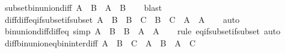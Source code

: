 \begin{isabellebody}
\isanewline
%
\endisadelimproof
\isanewline
{}\isamarkupfalse%
\ subset{\isacharunderscore}{\kern0pt}bin{\isacharunderscore}{\kern0pt}union{\isacharunderscore}{\kern0pt}diff{\isacharcolon}{\kern0pt}\ {\isachardoublequoteopen}A\ {\isasymsubseteq}\ B\ {\isasymunion}\ {\isacharparenleft}{\kern0pt}A\ {\isasymsetminus}\ B{\isacharparenright}{\kern0pt}{\isachardoublequoteclose}\isanewline
%
\isadelimproof
\ \ %
\endisadelimproof
%
\isatagproof
{}\isamarkupfalse%
\ blast%
\endisatagproof
{\isafoldproof}%
%
\isadelimproof
\isanewline
%
\endisadelimproof
\isanewline
{}\isamarkupfalse%
\ diff{\isacharunderscore}{\kern0pt}diff{\isacharunderscore}{\kern0pt}eq{\isacharunderscore}{\kern0pt}if{\isacharunderscore}{\kern0pt}subset{\isacharunderscore}{\kern0pt}if{\isacharunderscore}{\kern0pt}subset{\isacharcolon}{\kern0pt}\ {\isachardoublequoteopen}A\ {\isasymsubseteq}\ B\ {\isasymLongrightarrow}\ B\ {\isasymsubseteq}\ C\ {\isasymLongrightarrow}\ B\ {\isasymsetminus}\ {\isacharparenleft}{\kern0pt}C\ {\isasymsetminus}\ A{\isacharparenright}{\kern0pt}\ {\isacharequal}{\kern0pt}\ A{\isachardoublequoteclose}\isanewline
%
\isadelimproof
\ \ %
\endisadelimproof
%
\isatagproof
{}\isamarkupfalse%
\ auto%
\endisatagproof
{\isafoldproof}%
%
\isadelimproof
\isanewline
%
\endisadelimproof
\isanewline
{}\isamarkupfalse%
\ bin{\isacharunderscore}{\kern0pt}union{\isacharunderscore}{\kern0pt}diff{\isacharunderscore}{\kern0pt}diff{\isacharunderscore}{\kern0pt}eq\ {\isacharbrackleft}{\kern0pt}simp{\isacharbrackright}{\kern0pt}{\isacharcolon}{\kern0pt}\ {\isachardoublequoteopen}{\isacharparenleft}{\kern0pt}A\ {\isasymunion}\ B{\isacharparenright}{\kern0pt}\ {\isasymsetminus}\ {\isacharparenleft}{\kern0pt}B\ {\isasymsetminus}\ A{\isacharparenright}{\kern0pt}\ {\isacharequal}{\kern0pt}\ A{\isachardoublequoteclose}\isanewline
%
\isadelimproof
\ \ %
\endisadelimproof
%
\isatagproof
{}\isamarkupfalse%
\ {\isacharparenleft}{\kern0pt}rule\ eq{\isacharunderscore}{\kern0pt}if{\isacharunderscore}{\kern0pt}subset{\isacharunderscore}{\kern0pt}if{\isacharunderscore}{\kern0pt}subset{\isacharparenright}{\kern0pt}\ auto%
\endisatagproof
{\isafoldproof}%
%
\isadelimproof
\isanewline
%
\endisadelimproof
\isanewline
{}\isamarkupfalse%
\ diff{\isacharunderscore}{\kern0pt}bin{\isacharunderscore}{\kern0pt}union{\isacharunderscore}{\kern0pt}eq{\isacharunderscore}{\kern0pt}bin{\isacharunderscore}{\kern0pt}inter{\isacharunderscore}{\kern0pt}diff{\isacharcolon}{\kern0pt}\ {\isachardoublequoteopen}A\ {\isasymsetminus}\ {\isacharparenleft}{\kern0pt}B\ {\isasymunion}\ C{\isacharparenright}{\kern0pt}\ {\isacharequal}{\kern0pt}\ {\isacharparenleft}{\kern0pt}A\ {\isasymsetminus}\ B{\isacharparenright}{\kern0pt}\ {\isasyminter}\ {\isacharparenleft}{\kern0pt}A\ {\isasymsetminus}\ C{\isacharparenright}{\kern0pt}{\isachardoublequoteclose}\isanewline

\end{isabellebody}

